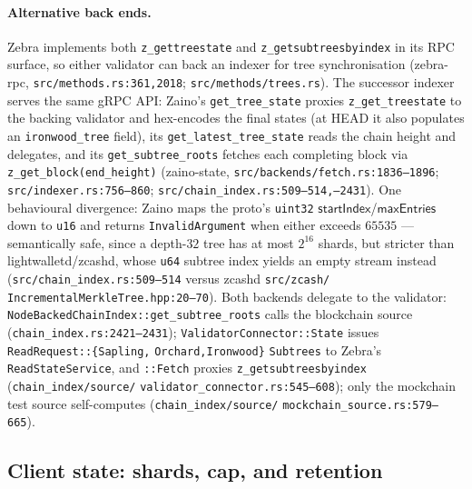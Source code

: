 \documentclass[11pt,a4paper]{article}
\theoremstyle{definition}
\begin{document}
\paragraph{Alternative back ends.} Zebra implements both
\texttt{z\_gettreestate} and \texttt{z\_getsubtreesbyindex} in its RPC
surface, so either validator can back an indexer for tree
synchronisation (\textsf{zebra-rpc},
\texttt{src/methods.rs:361,2018}; \texttt{src/methods/trees.rs}). The
successor indexer serves the same gRPC API: Zaino's
\texttt{get\_tree\_state} proxies \texttt{z\_get\_treestate} to the
backing validator and hex-encodes the final states (at HEAD it also
populates an \texttt{ironwood\_tree} field), its
\texttt{get\_latest\_tree\_state} reads the chain height and delegates,
and its \texttt{get\_subtree\_roots} fetches each completing block via
\texttt{z\_get\_block(end\_height)}
(\textsf{zaino-state},
\texttt{src/backends/}\allowbreak\texttt{fetch.rs:1836--1896};
\texttt{src/indexer.rs:756--860};
\texttt{src/chain\_index.rs:509--514,--2431}). One behavioural
divergence: Zaino maps the proto's \texttt{uint32}
$\mathsf{startIndex}$/$\mathsf{maxEntries}$ down to \texttt{u16} and
returns \texttt{InvalidArgument} when either exceeds $65535$ ---
semantically safe, since a depth-$32$ tree has at most $2^{16}$ shards,
but stricter than \textsf{lightwalletd}/\textsf{zcashd}, whose
\texttt{u64} subtree index yields an empty stream instead
(\texttt{src/chain\_index.rs:509--514} versus
\textsf{zcashd} \texttt{src/zcash/}\allowbreak
\texttt{IncrementalMerkleTree.hpp:20--70}).
Both backends delegate to the validator:
\texttt{NodeBackedChainIndex::}\allowbreak\texttt{get\_subtree\_roots}
calls the blockchain
source (\texttt{chain\_index.rs:2421--2431});
\texttt{ValidatorConnector::State} issues
\texttt{ReadRequest::}\allowbreak\texttt{\{Sapling,}\allowbreak%
\texttt{Orchard,}\allowbreak\texttt{Ironwood\}}\allowbreak%
\texttt{Subtrees} to Zebra's
\texttt{ReadStateService}, and \texttt{::Fetch} proxies
\texttt{z\_getsubtreesbyindex}
(\texttt{chain\_index/source/}\allowbreak
\texttt{validator\_connector.rs:545--608}); only
the mockchain test source self-computes
(\texttt{chain\_index/source/}\allowbreak
\texttt{mockchain\_source.rs:579--665}).

\subsection{Client state: shards, cap, and retention}
\label{sec:sync-tree-store}
\end{document}
